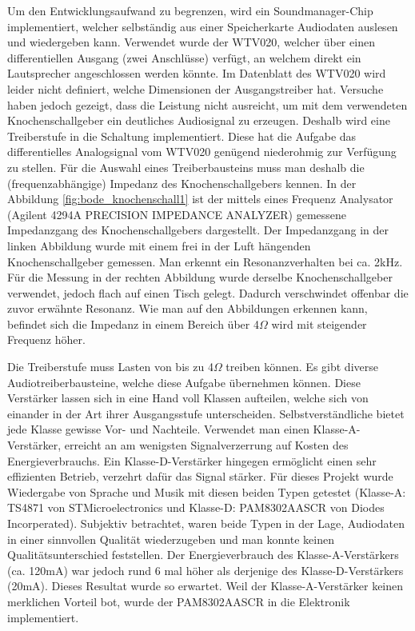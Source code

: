   Um den Entwicklungsaufwand zu begrenzen, wird ein Soundmanager-Chip implementiert, welcher selbständig aus einer Speicherkarte Audiodaten auslesen und wiedergeben kann. Verwendet wurde der WTV020, welcher über einen differentiellen Ausgang (zwei Anschlüsse) verfügt, an welchem direkt ein Lautsprecher angeschlossen werden könnte. 
  Im Datenblatt des WTV020 wird leider nicht definiert, welche Dimensionen der Ausgangstreiber hat. 
  Versuche haben jedoch gezeigt, dass die Leistung nicht ausreicht, um mit dem verwendeten Knochenschallgeber ein deutliches Audiosignal zu erzeugen. 
  Deshalb wird eine Treiberstufe in die Schaltung implementiert. 
  Diese hat die Aufgabe das differentielles Analogsignal vom WTV020 genügend niederohmig zur Verfügung zu stellen. 
  Für die Auswahl eines Treiberbausteins muss man deshalb die (frequenzabhängige) Impedanz des Knochenschallgebers kennen. 
  In der Abbildung \ref{fig:bode_knochenschall1} ist der mittels eines Frequenz Analysator (Agilent 4294A PRECISION IMPEDANCE ANALYZER) gemessene Impedanzgang des Knochenschallgebers dargestellt. 
  Der Impedanzgang in der linken Abbildung wurde mit einem frei in der Luft hängenden Knochenschallgeber gemessen. Man erkennt ein Resonanzverhalten bei ca. 2kHz. 
  Für die Messung in der rechten Abbildung wurde derselbe Knochenschallgeber verwendet, jedoch flach auf einen Tisch gelegt. 
  Dadurch verschwindet offenbar die zuvor erwähnte Resonanz. 
  Wie man auf den Abbildungen erkennen kann, befindet sich die Impedanz in einem Bereich über 4\(\Omega\) wird mit steigender Frequenz höher. 
  
  
  Die Treiberstufe muss Lasten von bis zu 4\(\Omega\) treiben können. 
  Es gibt diverse Audiotreiberbausteine, welche diese Aufgabe übernehmen können. 
  Diese Verstärker lassen sich in eine Hand voll Klassen aufteilen, welche sich von einander in der Art ihrer Ausgangsstufe unterscheiden. 
  Selbstverständliche bietet jede Klasse gewisse Vor- und Nachteile. 
  Verwendet man einen Klasse-A-Verstärker, erreicht an am wenigsten Signalverzerrung auf Kosten des Energieverbrauchs. 
  Ein Klasse-D-Verstärker hingegen ermöglicht einen sehr effizienten Betrieb, verzehrt dafür das Signal stärker. 
  Für dieses Projekt wurde Wiedergabe von Sprache und Musik mit diesen beiden Typen getestet (Klasse-A: TS4871 von STMicroelectronics und Klasse-D: PAM8302AASCR von Diodes Incorperated). 
  Subjektiv betrachtet, waren beide Typen in der Lage, Audiodaten in einer sinnvollen Qualität wiederzugeben und man konnte keinen Qualitätsunterschied feststellen. Der Energieverbrauch des Klasse-A-Verstärkers (ca. 120mA) war jedoch rund 6 mal höher als derjenige des Klasse-D-Verstärkers (20mA).
  Dieses Resultat wurde so erwartet. Weil der Klasse-A-Verstärker keinen merklichen Vorteil bot, wurde der PAM8302AASCR in die Elektronik implementiert.
  

